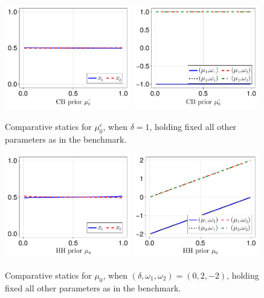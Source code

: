 \documentclass[12pt,a4paper]{article}
\begin{document}
\begin{figure}[H]
\centering
\includegraphics[width=0.49\textwidth]{figures/V8/γ_1/fig_optimal_π_across_μ_0_c_ω_1_1_ω_2_-1_δ_1.0_.pdf}
\includegraphics[width=0.49\textwidth]{figures/V8/γ_1/fig_posterior_across_μ_0_c_ω_1_1_ω_2_-1_δ_1.0_.pdf}
\caption{Comparative statics for $\mu_0^c$, when $\delta=1$, holding fixed all other parameters as in the benchmark.}
\label{FigureA24}
\end{figure}

\begin{figure}[H]
\centering
\includegraphics[width=0.49\textwidth]{figures/V8/γ_1/fig_optimal_π_across_μ_0_ω_1_2_ω_2_-2_δ_0.0_.pdf}
\includegraphics[width=0.49\textwidth]{figures/V8/γ_1/fig_posterior_across_μ_0_ω_1_2_ω_2_-2_δ_0.0_.pdf}
\caption{Comparative statics for $\mu_0$, when $(\delta,\omega_1,\omega_2)=(0,2,-2)$, holding fixed all other parameters as in the benchmark.}
\label{FigureA25}
\end{figure}
\end{document}
